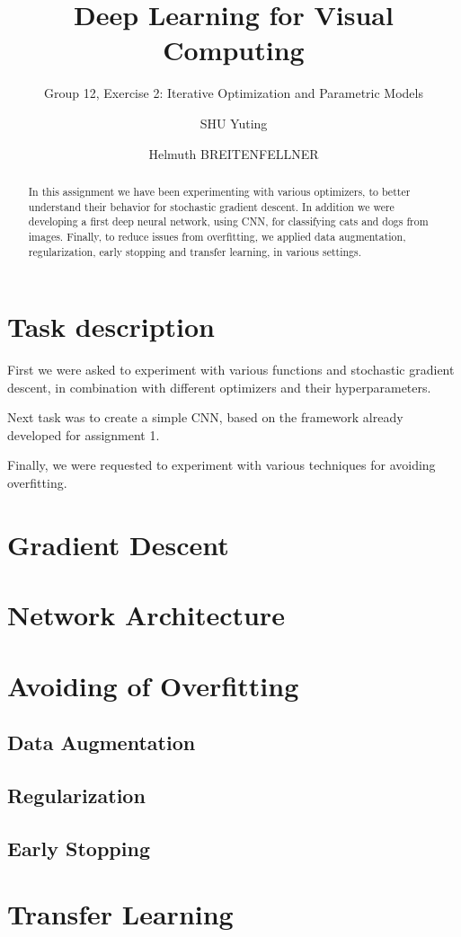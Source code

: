 \documentclass[sigconf,nonacm]{acmart}
\begin{document}
\title{Deep Learning for Visual Computing}
\subtitle{Group 12, Exercise 2: Iterative Optimization and Parametric Models}
\author{SHU Yuting}
\author{Helmuth BREITENFELLNER}
\begin{abstract}
In this assignment we have been experimenting with various optimizers,
to better understand their behavior for stochastic gradient
descent.
In addition we were developing a first deep neural network, using CNN,
for classifying cats and dogs from images.
Finally, to reduce issues from overfitting, we applied data augmentation,
regularization, early stopping and transfer learning, in various settings.
\end{abstract}
\maketitle
\section{Task description}
First we were asked to experiment with various functions and stochastic
gradient descent, in combination with different optimizers and
their hyperparameters.

Next task was to create a simple CNN, based on the framework already developed
for assignment 1.

Finally, we were requested to experiment with various techniques for avoiding overfitting.

\section{Gradient Descent}

\section{Network Architecture}

\section{Avoiding of Overfitting}

\subsection{Data Augmentation}

\subsection{Regularization}

\subsection{Early Stopping}

\section{Transfer Learning}



\end{document}
